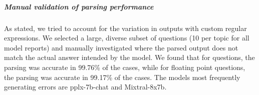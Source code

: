 \subparagraph*{Manual validation of parsing performance}

As stated, we tried to account for the variation in outputs with custom regular expressions.
We selected a large, diverse subset of questions (10 per topic for all model reports) and manually investigated where the parsed output does not match the actual answer intended by the model.
We found that for  questions, the parsing was accurate in 99.76\% of the cases, while for floating point questions, the parsing was accurate in 99.17\% of the cases.
The models most frequently generating errors are pplx-7b-chat and Mixtral-8x7b.
